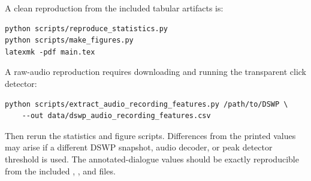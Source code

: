 \documentclass[11pt]{article}
\begin{document}
A clean reproduction from the included tabular artifacts is:
\begin{lstlisting}
python scripts/reproduce_statistics.py
python scripts/make_figures.py
latexmk -pdf main.tex
\end{lstlisting}

A raw-audio reproduction requires downloading  and running the transparent click detector:
\begin{lstlisting}
python scripts/extract_audio_recording_features.py /path/to/DSWP \
    --out data/dswp_audio_recording_features.csv
\end{lstlisting}
Then rerun the statistics and figure scripts. Differences from the printed values may arise if a different DSWP snapshot, audio decoder, or peak detector threshold is used. The annotated-dialogue values should be exactly reproducible from the included , , and  files.
\end{document}

